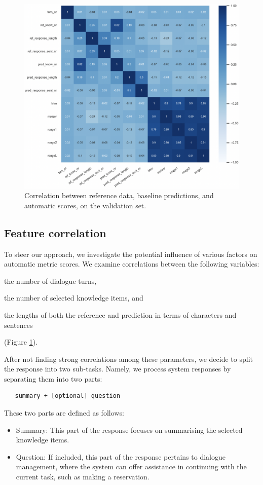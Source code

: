\documentclass[11pt]{article}
\begin{document}
\begin{figure}[htb]
    \centering
    \includegraphics[width=.5\textwidth]{images/correlations2.png}
    \caption{Correlation between reference data, baseline predictions, and automatic scores, on the validation set.}
    \label{fig:correlations_baseline}
\end{figure}

\subsection{Feature correlation}
To steer our approach, we investigate the potential influence of various factors on automatic metric scores. We examine correlations between the following variables: \begin{enumerate*}[label=(\arabic*)]
    \item the number of dialogue turns,
    \item the number of selected knowledge items, and
    \item the lengths of both the reference and prediction in terms of characters and sentences
\end{enumerate*} (Figure \ref{fig:correlations_baseline}).



\noindent After not finding strong correlations among these parameters, we decide to split the response into two sub-tasks. Namely, we process system responses by separating them into two parts: \begin{verbatim}
   summary + [optional] question
\end{verbatim}

These two parts are defined as follows:
\begin{itemize}
    \item Summary: This part of the response focuses on summarising the selected knowledge items.
    \item Question: If included, this part of the response pertains to dialogue management, where the system can offer assistance in continuing with the current task, such as making a reservation.
\end{itemize}
\end{document}
